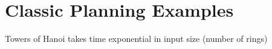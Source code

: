 \section{Classic Planning Examples}

  Towers of Hanoi takes time exponential in input size (number of rings)